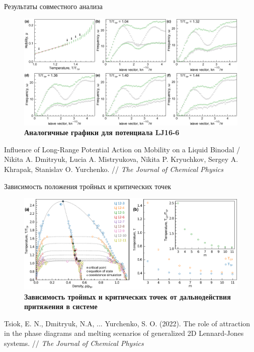 \documentclass{beamer} %
\begin{document}
\begin{frame}{Результаты совместного анализа}
  \footnotesize{

    \begin{figure}
      \centering
      \includegraphics[width=\textwidth]{MACR-Figure7}
      \caption{\footnotesize \textbf{Аналогичные графики для потенциала LJ16-6}}
      \label{Figure4}
    \end{figure}
  }

  \tiny{Influence of Long-Range Potential Action on Mobility on a Liquid Binodal / Nikita A. Dmitryuk, Lucia A. Mistryukova, Nikita P. Kryuchkov, Sergey A. Khrapak, Stanislav O. Yurchenko. // \textit{The Journal of Chemical Physics}}
\end{frame}




\begin{frame}{Зависимость положения тройных и критических точек}
  \footnotesize{

    \begin{figure}
      \centering
      \includegraphics[width=\textwidth]{NMP-Figure4}
      \caption{\footnotesize \textbf{Зависимость тройных и критических точек от дальнодействия притяжения в системе}}
      \label{Figure4}
    \end{figure}
  }

  \tiny{Tsiok, E. N., Dmitryuk, N.A, ... Yurchenko, S. O. (2022). The role of attraction in the phase diagrams and melting scenarios of generalized 2D Lennard-Jones systems. // \textit{The Journal of Chemical Physics}}
\end{frame}
\end{document}
